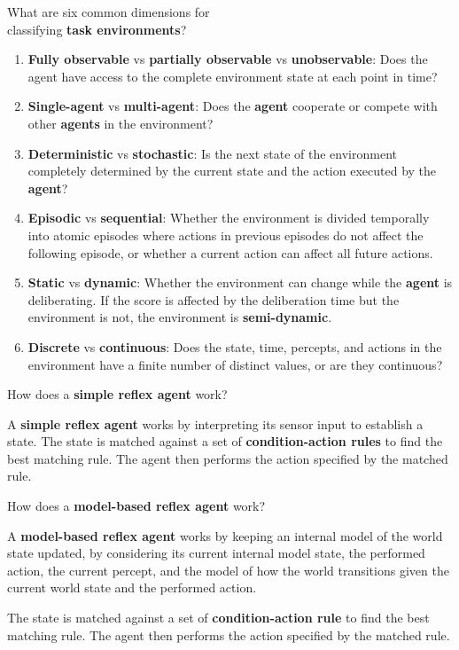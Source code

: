 \begin{flashcard}[Question]{What are six common dimensions for\\classifying \textbf{task environments}?}
\footnotesize
\begin{center}
\begin{enumerate}
\item \textbf{Fully observable} vs \textbf{partially observable} vs \textbf{unobservable}: Does the agent have access to the complete environment state at each point in time?
\item \textbf{Single-agent} vs \textbf{multi-agent}: Does the \textbf{agent} cooperate or compete with other \textbf{agents} in the environment?
\item \textbf{Deterministic} vs \textbf{stochastic}: Is the next state of the environment completely determined by the current state and the action executed by the \textbf{agent}?
\item \textbf{Episodic} vs \textbf{sequential}: Whether the environment is divided temporally into atomic episodes where actions in previous episodes do not affect the following episode, or whether a current action can affect all future actions.
\item \textbf{Static} vs \textbf{dynamic}: Whether the environment can change while the \textbf{agent} is deliberating. If the score is affected by the deliberation time but the environment is not, the environment is \textbf{semi-dynamic}.
\item \textbf{Discrete} vs \textbf{continuous}: Does the state, time, percepts, and actions in the environment have a finite number of distinct values, or are they continuous?
\end{enumerate}
\end{center}
\end{flashcard}

\begin{flashcard}[Question]{How does a \textbf{simple reflex agent} work?}
\begin{center}
A \textbf{simple reflex agent} works by interpreting its sensor input to establish a state. The state is matched against a set of \textbf{condition-action rules} to find the best matching rule. The agent then performs the action specified by the matched rule.
\end{center}
\end{flashcard}

\begin{flashcard}[Question]{How does a \textbf{model-based reflex agent} work?}
\begin{center}
A \textbf{model-based reflex agent} works by keeping an internal model of the world state updated, by considering its current internal model state, the performed action, the current percept, and the model of how the world transitions given the current world state and the performed action.

\medskip

The state is matched against a set of \textbf{condition-action rule} to find the best matching rule. The agent then performs the action specified by the matched rule.
\end{center}
\end{flashcard}

